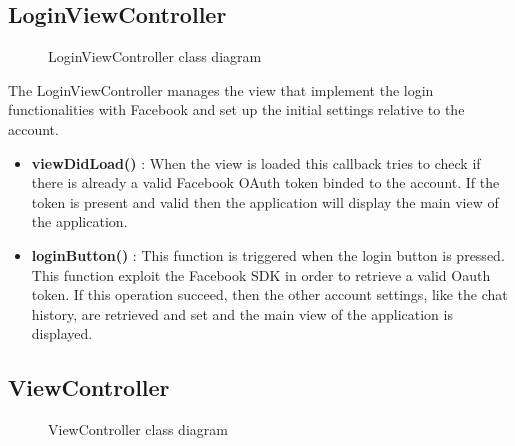 \subsection{LoginViewController} 
\begin{figure}[H]
\caption{LoginViewController class diagram}
\end{figure}

The LoginViewController manages the view that implement the login functionalities with Facebook and set up the initial settings relative to the account.

\begin{itemize}
\item \textbf{viewDidLoad()} : When the view is loaded this callback tries to check if there is already a valid Facebook OAuth token binded to the account. If the token is present and valid then the application will display the main view of the application.
\item \textbf{loginButton()} : This function is triggered when the login button is pressed. This function exploit the Facebook SDK in order to retrieve a valid Oauth token. If this operation succeed, then the other account settings, like the chat history, are retrieved and set and the main view of the application is displayed.
\end{itemize}


\subsection{ViewController} 
\begin{figure}[H]
\caption{ViewController class diagram}
\end{figure}


